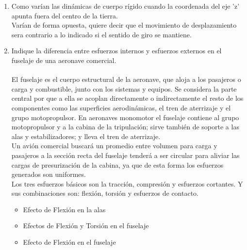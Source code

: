 \documentclass[12pt,oneside,spanish]{article}
\begin{document}
\begin{enumerate}
    \item Como varían las dinámicas de cuerpo rígido cuando la coordenada del eje 'z' apunta fuera del centro de la tierra.\\
Varían de forma opuesta, quiere decir que el movimiento de desplazamiento sera contrario a lo indicado si el sentido de giro se mantiene.
    
    \item Indique la diferencia entre esfuerzos internos y esfuerzos externos en el fuselaje de una aeronave comercial.\\ \\
    El fuselaje es el cuerpo estructural de la aeronave, que
aloja a los pasajeros o carga y combustible, junto con los sistemas y equipos. Se considera la parte central por que a ella se acoplan directamente o indirectamente el resto de los componentes como las superficies aerodinámicas, el tren de aterrizaje y el grupo motopropulsor. En aeronaves monomotor el fuselaje contiene al grupo motopropulsor y a la cabina de la tripulación; sirve también de soporte a las alas y estabilizadores; y lleva el tren de aterrizaje.\\
Un avión comercial buscará un promedio entre volumen
para carga y pasajeros a la sección recta del fuselaje tenderá a ser circular para aliviar las cargas de presurización de la cabina, ya que de esta forma los esfuerzos generados son uniformes.\\
Los tres esfuerzos básicos son la tracción, compresión y esfuerzos cortantes. Y sus combinaciones son: flexión, torsión y esfuerzos de contacto.
\begin{itemize}
    \item Efecto de Flexión en la alas
    \item Efectos de Flexión y Torsión en el fuselaje
    \item Efecto de Flexión en el fuselaje
\end{itemize}



\end{enumerate}
\end{document}
